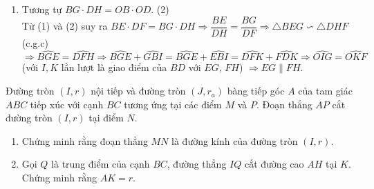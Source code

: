 \begin{bt}
{\begin{enumerate}
			Dẫn tới $\triangle BOE \backsim \triangle DFO$ (g.g) $\Rightarrow \dfrac{BE}{OD}=\dfrac{OB}{DF} \Rightarrow BE\cdot DF=OB\cdot OD$. \hfill(1)
			\item Tương tự $BG\cdot DH=OB\cdot OD$. \hfill(2)\\
			Từ (1) và (2) suy ra $BE\cdot DF=BG\cdot DH \Rightarrow \dfrac{BE}{DH}=\dfrac{BG}{DF} \Rightarrow \triangle BEG \backsim \triangle DHF$ (c.g.c)
			$\Rightarrow \widehat{BGE}=\widehat{DFH}\Rightarrow \widehat{BGE}+\widehat{GBI}=\widehat{BGE}+\widehat{EBI}=\widehat{DFK}+\widehat{FDK} \Rightarrow \widehat{OIG}=\widehat{OKF}$\\
			(với $I, K$ lần lượt là giao điểm của $BD$ với $EG$, $FH$) $\Rightarrow EG\parallel FH$.
		\end{enumerate}
	}
\end{bt}
\begin{bt}
	Đường tròn $(I,r)$ nội tiếp và đường tròn $(J,r_a)$ bàng tiếp góc $A$ của tam giác $ABC$ tiếp xúc với cạnh $BC$ tương ứng tại các điểm $M$ và $P$. Đoạn thẳng $AP$ cắt đường tròn $(I,r)$ tại điểm $N$.
	\begin{enumerate}
		\item Chứng minh rằng đoạn thẳng $MN$ là đường kính của đường tròn $(I,r)$.
		\item Gọi $Q$ là trung điểm của cạnh $BC$, đường thẳng $IQ$ cắt đường cao $AH$ tại $K$. Chứng minh rằng $AK=r$.
	\end{enumerate}
\end{bt}
